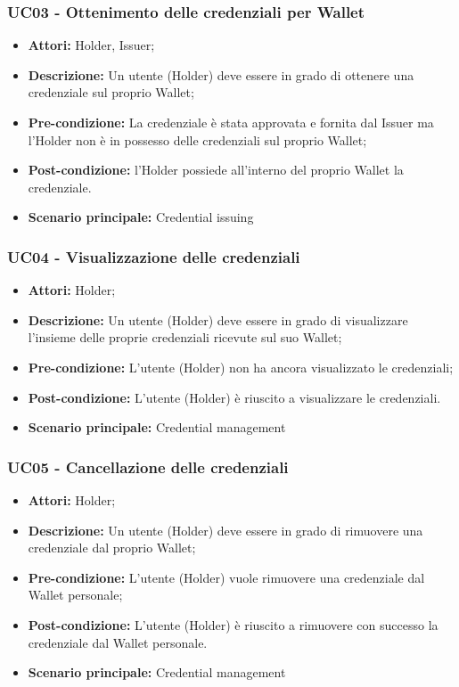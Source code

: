 \subsubsection{UC03 - Ottenimento delle credenziali per Wallet}
\begin{itemize}
\item \textbf{Attori:} Holder, Issuer;
\item \textbf{Descrizione:} Un utente (Holder) deve essere in grado di ottenere una credenziale sul proprio Wallet;
\item\textbf{Pre-condizione:} La credenziale è stata approvata e fornita dal Issuer ma l'Holder non è in possesso delle credenziali sul proprio Wallet;
\item \textbf{Post-condizione:} l'Holder possiede all’interno del proprio Wallet la credenziale.
\item \textbf{Scenario principale:} Credential issuing
\end{itemize}

\subsubsection{UC04 - Visualizzazione delle credenziali}
\begin{itemize}
\item \textbf{Attori:} Holder;
\item \textbf{Descrizione:} Un utente (Holder) deve essere in grado di visualizzare l'insieme delle proprie credenziali ricevute sul suo Wallet;
\item \textbf{Pre-condizione:} L’utente (Holder) non ha ancora visualizzato le credenziali;
\item \textbf{Post-condizione:} L’utente (Holder) è riuscito a visualizzare le credenziali.
\item \textbf{Scenario principale:} Credential management
\end{itemize}

\subsubsection{UC05 - Cancellazione delle credenziali}
\begin{itemize}
\item \textbf{Attori:} Holder;
\item \textbf{Descrizione:} Un utente (Holder) deve essere in grado di rimuovere una credenziale dal proprio Wallet;
\item \textbf{Pre-condizione:} L’utente (Holder) vuole rimuovere una credenziale dal Wallet personale;
\item \textbf{Post-condizione:} L’utente (Holder) è riuscito a rimuovere con successo la credenziale dal Wallet personale.
\item \textbf{Scenario principale:} Credential management
\end{itemize}

